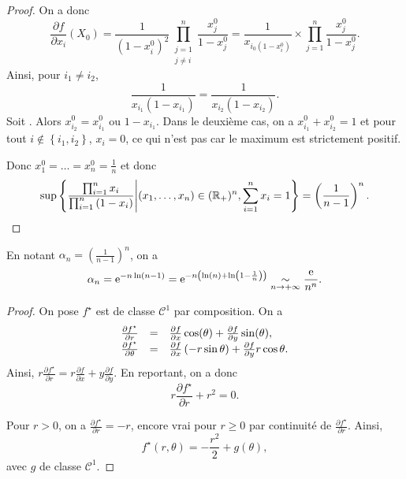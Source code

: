 \documentclass[12pt]{article}
\begin{document}
\begin{proof}
	On a donc 
	\begin{equation}
		\frac{\partial f}{\partial x_i}(X_0)=\frac{1}{(1-x_i^{0})^{2}}\prod_{\substack{j=1\\ j\neq i}}^{n}\frac{x_j^{0}}{1-x_j^{0}}=\frac{1}{x_{i_{0}(1-x_i^{0})}}\times\prod_{j=1}^{n}\frac{x_j^{0}}{1-x_j^{0}}.
	\end{equation}
	Ainsi, pour $i_1\neq i_2$, 
	\begin{equation}
		\frac{1}{x_{i_{1}}(1-x_{i_{1}})}=\frac{1}{x_{i_{2}}(1-x_{i_{2}})}.
	\end{equation}
	Soit \function{\psi}{]0,1[}{\R}{t}{t(1-t)}. Alors $x_{i_{2}}^{0}=x_{i_{1}}^{0}$ ou $1-x_{i_{1}}$. Dans le deuxième cas, on a $x_{i_{1}}^{0}+x_{i_{2}}^{0}=1$ et pour tout $i\not\in\left\lbrace i_{1},i_{2}\right\rbrace$, $x_i=0$, ce qui n'est pas car le maximum est strictement positif.

	Donc $x_1^{0}=\dots=x_{n}^{0}=\frac{1}{n}$ et donc 
	\begin{equation}
		\sup\left\lbrace\frac{\prod_{i=1}^{n}x_i}{\prod_{i=1}^{n}\left(1-x_i\right)}\middle| (x_1,\dots,x_n)\in(\mathbb{R}_{+})^{n},\sum_{i=1}^{n}x_i=1\right\rbrace=\left(\frac{1}{n-1}\right)^{n}.
	\end{equation}
\end{proof}

\begin{remark}
	En notant $\alpha_{n}=\left(\frac{1}{n-1}\right)^{n}$, on a 
	\begin{equation}
		\alpha_n=\mathrm{e}^{-n\ln(n-1)}=\mathrm{e}^{-n\left(\ln(n)+\ln\left(1-\frac{1}{n}\right)\right)}\underset{n\to+\infty}{\sim}\frac{\mathrm{e}}{n^{n}}.
	\end{equation}
\end{remark}

\begin{proof}
	On pose 
	$f^{\star}$ est de classe $\mathcal{C}^{1}$ par composition. On a 
	\begin{equation}
		\begin{array}[]{rcl}
			\frac{\partial f^{\star}}{\partial r} &=& \frac{\partial f}{\partial x}\cos(\theta)+\frac{\partial f}{\partial y}\sin(\theta),\\
			\frac{\partial f^{\star}}{\partial \theta} &=& \frac{\partial f}{\partial x}\left(-r\sin\theta\right)+\frac{\partial f}{\partial y}r\cos\theta.
		\end{array}
	\end{equation}
	Ainsi, $r\frac{\partial f^{\star}}{\partial r}=r\frac{\partial f}{\partial x}+y\frac{\partial f}{\partial y}$. En reportant, on a donc 
	\begin{equation}
		r\frac{\partial f^{\star}}{\partial r}+r^{2}=0.
	\end{equation}

	Pour $r>0$, on a $\frac{\partial f^{\star}}{\partial r}=-r$, encore vrai pour $r\geqslant0$ par continuité de $\frac{\partial f^{\star}}{\partial r}$. Ainsi,
	\begin{equation}
		f^{\star}(r,\theta)=-\frac{r^{2}}{2}+g(\theta),
	\end{equation}
	avec $g$ de classe $\mathcal{C}^{1}$.
\end{proof}
\end{document}
